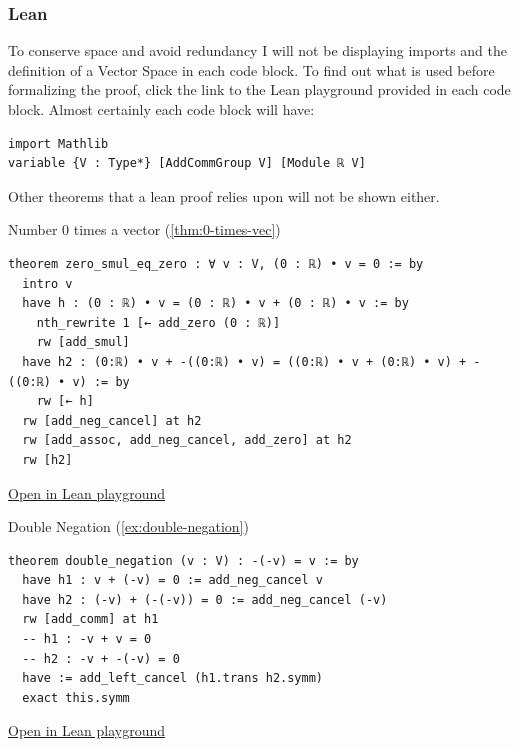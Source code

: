 \documentclass[12pt]{book}
\begin{document}
\newpage

\subsubsection{Lean}

To conserve space and avoid redundancy I will not be displaying imports and the definition of a Vector Space in each code block. To find out what is used before formalizing the proof, click the link to the Lean playground provided in each code block. Almost certainly each code block will have:

\begin{verbatim}
import Mathlib
variable {V : Type*} [AddCommGroup V] [Module ℝ V]
\end{verbatim}

Other theorems that a lean proof relies upon will not be shown either.

\vspace{1cm}

\begin{leanbox}{Number 0 times a vector (\ref{thm:0-times-vec})} \label{lean:0-times-vec}
\begin{verbatim}
theorem zero_smul_eq_zero : ∀ v : V, (0 : ℝ) • v = 0 := by
  intro v
  have h : (0 : ℝ) • v = (0 : ℝ) • v + (0 : ℝ) • v := by
    nth_rewrite 1 [← add_zero (0 : ℝ)]
    rw [add_smul]
  have h2 : (0:ℝ) • v + -((0:ℝ) • v) = ((0:ℝ) • v + (0:ℝ) • v) + -((0:ℝ) • v) := by
    rw [← h]
  rw [add_neg_cancel] at h2
  rw [add_assoc, add_neg_cancel, add_zero] at h2
  rw [h2]
\end{verbatim}
\href{https://live.lean-lang.org/#codez=JYWwDg9gTgLgBAWQIYwBYBtgCMBQOBuSUwSW6ApnAN4BqcAXHACoCeY5AVAL5wDaAggBNBAYQggQAcSgQArmDg0AunwQRBsinEC4hIqV405aORBwAXuRkB9AM4hNV8gEcrFmQziAAIjj4PNADRwABQADB7aAJRwgEQEPnAAvHBh9IlYLDhwcMAAdjDu%2BBlwqEj4lKgeoeFRsb6JlYyRMXEA1MHJOtVxKXBphZm5qFZQ5ADuxDCUAIx8gAmEcEjCrpYQbVX6mZlQI3wLgrb26OtFJWUATBUh9I01cK0AtEGhV534UXVP1y1tz02vt3APD4vKLdXobOBbWZFI6Q3i7KzZcgAcysAGMkNlUeRDvN4KhToVYfCkDYbBBUYF4YiUejMdjKYs3BAVCgigTNttePijkA}{Open in Lean playground}
\end{leanbox}


\begin{leanbox}{Double Negation (\ref{ex:double-negation})} \label{lean:double-negation}
\begin{verbatim}
theorem double_negation (v : V) : -(-v) = v := by
  have h1 : v + (-v) = 0 := add_neg_cancel v
  have h2 : (-v) + (-(-v)) = 0 := add_neg_cancel (-v)
  rw [add_comm] at h1
  -- h1 : -v + v = 0
  -- h2 : -v + -(-v) = 0
  have := add_left_cancel (h1.trans h2.symm)
  exact this.symm
\end{verbatim}
\href{https://live.lean-lang.org/#codez=JYWwDg9gTgLgBAWQIYwBYBtgCMBQOBuSUwSW6ApnAN4BqcAXHACoCeY5AVAL5wDaAggBNBAYQggQAcSgQArmDg0AunwQRBsinEC4hIqV405aORBxBcsuQD6AO3IBzFMAg24ACnwNFASi8BaNz98XwBeOE96MKwWHDg4VCR8SlQARi9PAGp3INC4AAYGMKRhWwcrAGMkG3LydHDY%2BMTkgCYvQOC4LMD271yCyLhiwVL7Cqqaup6GqAB3PiGK8RAVFHiUhr8%2FNf9M8LgwvI2t1FbGIM64AJz9%2FIaEpMLBkooAMxgx6tr3VIA6GCgqgBneLNH6AlgSbwNcgADyQ5XgaGAgLBEJAQA}{Open in Lean playground}
\end{leanbox}
\end{document}
